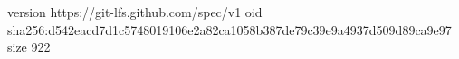 version https://git-lfs.github.com/spec/v1
oid sha256:d542eacd7d1c5748019106e2a82ca1058b387de79c39e9a4937d509d89ca9e97
size 922
